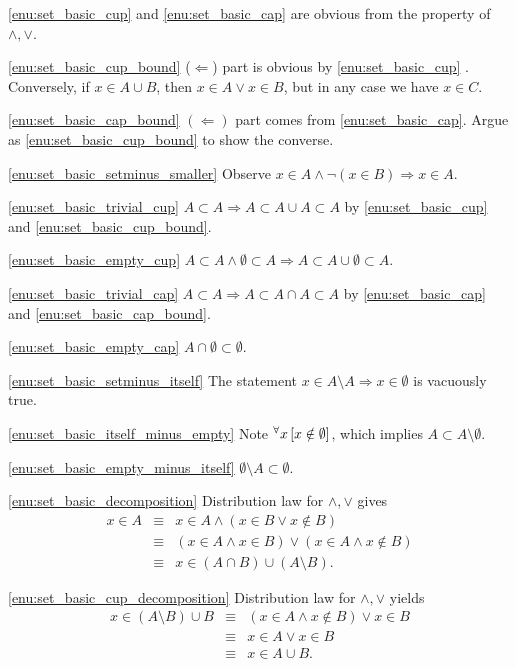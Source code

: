 \documentclass[a4paper,12pt]{article}
\begin{document}
\begin{prf}
	\ref{enu:set_basic_cup} and \ref{enu:set_basic_cap}
	are obvious from the property of \( \wedge,\vee \).
	
	\ref{enu:set_basic_cup_bound}
	(\( \Leftarrow \)) part is obvious by \ref{enu:set_basic_cup} .
	Conversely, if \( x\in A\cup B \), then \( x\in A \vee  x \in B \),
	but in any case we have \(  x \in C \).
	
	\ref{enu:set_basic_cap_bound}
	\( (\Leftarrow) \) part comes from \ref{enu:set_basic_cap}.
	Argue as \ref{enu:set_basic_cup_bound} to show the converse.
	
	\ref{enu:set_basic_setminus_smaller}
	Observe
	\( x\in A \wedge \neg( x \in B) \Rightarrow x\in A\).
	
	\ref{enu:set_basic_trivial_cup}
	\( A \subset A \Rightarrow A \subset A \cup A \subset A\)
	by \ref{enu:set_basic_cup} and \ref{enu:set_basic_cup_bound}.
	
	\ref{enu:set_basic_empty_cup}
	\( A \subset A \wedge \emptyset \subset A \Rightarrow A \subset A \cup \emptyset \subset A\).
	
	\ref{enu:set_basic_trivial_cap}
	\( A \subset A \Rightarrow A \subset A \cap A \subset A\)
	by \ref{enu:set_basic_cap} and \ref{enu:set_basic_cap_bound}.
	
	\ref{enu:set_basic_empty_cap}
	\( A \cap \emptyset \subset \emptyset \).
	
	\ref{enu:set_basic_setminus_itself}
	The statement \( x\in A\setminus A \Rightarrow  x \in \emptyset \)
	is vacuously true.
	
	\ref{enu:set_basic_itself_minus_empty}
	Note \( {}^{\forall}  x\left[ x \notin \emptyset \right] \),
	which implies
	\( A \subset A \setminus \emptyset \).
	
	\ref{enu:set_basic_empty_minus_itself}
	\( \emptyset \setminus A \subset \emptyset \).
	
	\ref{enu:set_basic_decomposition}
	Distribution law for \( \wedge,\vee \) gives
	\begin{eqnarray*}
		x \in A
		&\equiv&
		x \in A \wedge( x \in B \vee x \notin B)\\
		&\equiv&
		( x \in A \wedge x \in B) \vee ( x \in A \wedge x \notin B)\\
		&\equiv&
		x \in (A \cap B)\cup(A \setminus B).
	\end{eqnarray*}
	
	\ref{enu:set_basic_cup_decomposition}
	Distribution law for \( \wedge,\vee \) yields
	\begin{eqnarray*}
		x \in (A \setminus B) \cup B
		&\equiv&
		(x \in A \wedge  x \notin B) \vee  x \in B\\
		&\equiv&
		x \in A \vee  x \in B\\
		&\equiv&
		x \in A\cup B.
	\end{eqnarray*}
	

\end{prf}
\end{document}
